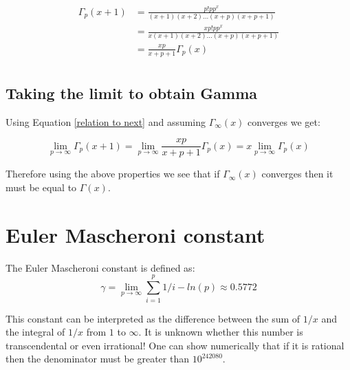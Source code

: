 \documentclass[a4paper]{article}
\begin{document}
\begin{equation}\label{relation to next}
\begin{split}
\Gamma_{p}(x+1) &= \frac{p! p p^x}{(x + 1)(x+2)...(x+p)(x+p+1)} \\
&= \frac{x p! p p^x}{x(x + 1)(x+2)...(x+p)(x+p+1)} \\
&= \frac{x p}{x+p+1} \Gamma_{p}(x) \\
\end{split}
\end{equation}

\subsection{Taking the limit to obtain Gamma}

Using Equation \ref{relation to next} and assuming $\Gamma_{\infty}(x)$ converges we get:

\begin{equation}
\lim_{p \to \infty} \Gamma_{p}(x+1) = 
\lim_{p \to \infty} \frac{x p}{x+p+1} \Gamma_{p}(x) = x \lim_{p \to \infty} \Gamma_{p}(x)
\end{equation}

Therefore using the above properties we see that if $\Gamma_{\infty}(x)$ converges then it must be equal to $\Gamma(x)$. 



\section{Euler Mascheroni constant}\label{euler const}
The Euler Mascheroni constant is defined as:
\begin{equation}\label{gamma def}
\gamma = \lim_{p \to \infty} \sum_{i=1}^{p} 1/i - ln(p) \approx 0.5772
\end{equation}

This constant can be interpreted as the difference between the sum of $1/x$ and the integral of $1/x$ from $1$ to $\infty$. 
It is unknown whether this number is transcendental or even irrational! 
One can show numerically that if it is rational then the denominator must be greater than $10^{242080}$.
\end{document}
